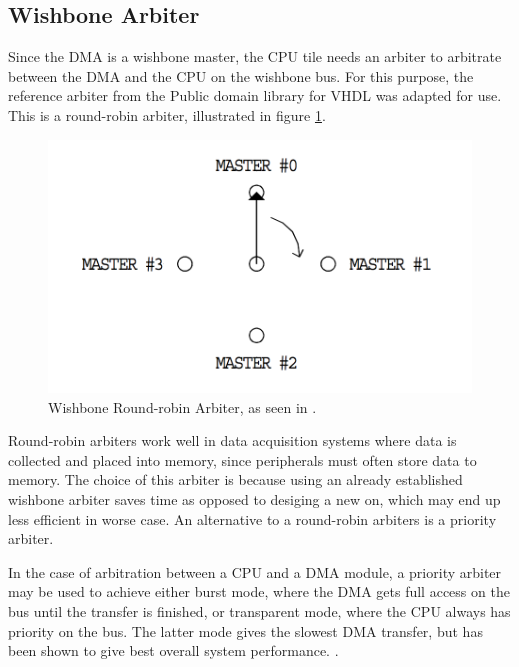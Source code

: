 \subsection{Wishbone Arbiter}
Since the DMA is a wishbone master, the CPU tile needs an arbiter to arbitrate between the DMA and the CPU
on the wishbone bus. For this purpose, the reference arbiter from the Public domain library for VHDL \cite{WBLibrary}
was adapted for use. This is a round-robin arbiter, illustrated in figure \ref{fig:WBArbiter}.

%
%
\begin{figure}[htb]
    \centering
    \includegraphics[width=1.0\textwidth]{Figures/Tile/WBArbiter}
    \caption{Wishbone Round-robin Arbiter, as seen in \cite{WBLibrary}.}
    \label{fig:WBArbiter}
\end{figure}

Round-robin arbiters work well in data acquisition systems where data is collected and placed into memory, since peripherals must often store data to memory. %
The choice of this arbiter is because using an already established wishbone arbiter saves time as opposed to desiging a new on, which may end up less efficient in worse case.
An alternative to a round-robin arbiters is a priority arbiter.

In the case of arbitration between a CPU and a DMA module, a priority arbiter may be used to achieve either burst mode, where the DMA gets full access on the bus until the transfer is finished, or transparent mode, where the CPU always has priority on the bus.
The latter mode gives the slowest DMA transfer, but has been shown to give best overall system performance.  \cite{DMA-lecture}.

